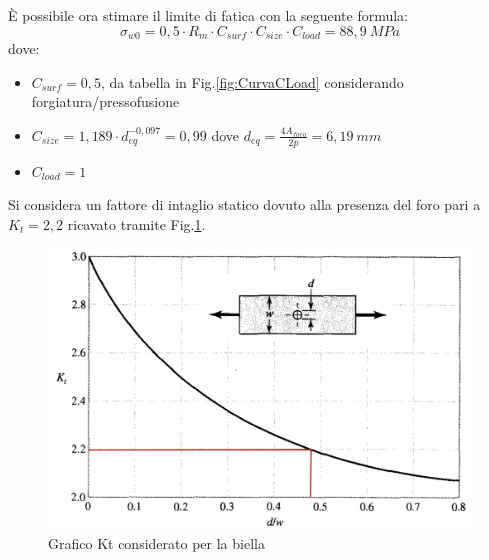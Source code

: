 È possibile ora stimare il limite di fatica con la seguente formula:
\begin{equation}
    \sigma_{w0}=0,5\cdot R_m\cdot C_{surf}\cdot C_{size}\cdot C_{load}=88,9\ MPa
\end{equation}
dove:
\begin{itemize}
    \item $C_{surf}=0,5$, da tabella in Fig.\ref{fig:CurvaCLoad} considerando forgiatura/pressofusione 
    \item $C_{size}=1,189\cdot d_{eq}^{-0,097}=0,99$ dove $d_{eq}=\frac{4A_{foro}}{2p}=6,19\ mm$ 
    \item $C_{load}=1$
\end{itemize}
Si considera un fattore di intaglio statico dovuto alla presenza del foro pari a $K_t=2,2$ ricavato tramite Fig.\ref{fig:KtBiella}.
\begin{figure}[h]
    \centering
    \includegraphics[scale=0.25]{Immagini/KtBiella.png}
    \caption{Grafico Kt considerato per la biella}
    \label{fig:KtBiella}
\end{figure}

